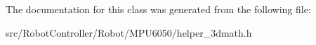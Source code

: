 The documentation for this class was generated from the following file\+:\begin{DoxyCompactItemize}
\item 
src/\+Robot\+Controller/\+Robot/\+M\+P\+U6050/helper\+\_\+3dmath.\+h\end{DoxyCompactItemize}

